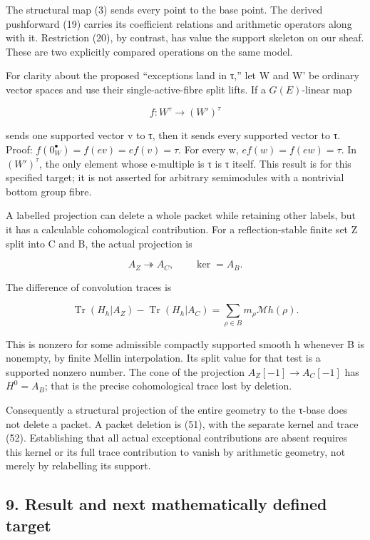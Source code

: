 \documentclass[
]{article}
\begin{document}
The structural map (3) sends every point to the base point. The derived
pushforward (19) carries its coefficient relations and arithmetic
operators along with it. Restriction (20), by contrast, has value the
support skeleton on our sheaf. These are two explicitly compared
operations on the same model.

For clarity about the proposed ``exceptions land in τ,'' let W and W' be
ordinary vector spaces and use their single-active-fibre split lifts. If
a \(G(E)\)-linear map

\[
f:W^\tau\to(W')^\tau
\]

sends one supported vector v to τ, then it sends every supported vector
to τ. Proof: \(f(0_W^\bullet)=f(ev)=ef(v)=\tau\). For every w,
\(ef(w)=f(ew)=\tau\). In \((W')^\tau\), the only element whose
e-multiple is τ is τ itself. This result is for this specified target;
it is not asserted for arbitrary semimodules with a nontrivial bottom
group fibre.

A labelled projection can delete a whole packet while retaining other
labels, but it has a calculable cohomological contribution. For a
reflection-stable finite set Z split into C and B, the actual projection
is

\[
A_Z\twoheadrightarrow A_C,\qquad\ker=A_B.
\tag{51}
\]

The difference of convolution traces is

\[
\operatorname{Tr}(H_h|A_Z)-\operatorname{Tr}(H_h|A_C)
=\sum_{\rho\in B}m_\rho\mathcal Mh(\rho).
\tag{52}
\]

This is nonzero for some admissible compactly supported smooth h
whenever B is nonempty, by finite Mellin interpolation. Its split value
for that test is a supported nonzero number. The cone of the projection
\(A_Z[-1]\to A_C[-1]\) has \(H^0=A_B\); that is the precise
cohomological trace lost by deletion.

Consequently a structural projection of the entire geometry to the
τ-base does not delete a packet. A packet deletion is (51), with the
separate kernel and trace (52). Establishing that all actual exceptional
contributions are absent requires this kernel or its full trace
contribution to vanish by arithmetic geometry, not merely by relabelling
its support.

\subsection{9. Result and next mathematically defined
target}\label{result-and-next-mathematically-defined-target}
\end{document}
